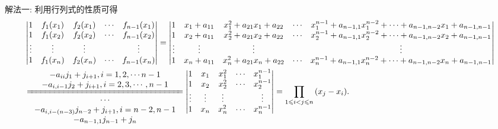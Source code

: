 \documentclass[../../main.tex]{subfiles}%
\begin{document}
\begin{solution}

{\color{blue}解法一:}
利用行列式的性质可得
\begin{align*}
&\left| \begin{matrix}
1&		f_1(x_1)&		f_2(x_1)&		\cdots&		f_{n-1}(x_1)\\
1&		f_1(x_2)&		f_2(x_2)&		\cdots&		f_{n-1}(x_2)\\
\vdots&		\vdots&		\vdots&		&		\vdots\\
1&		f_1(x_n)&		f_2(x_n)&		\cdots&		f_{n-1}(x_n)\\
\end{matrix} \right|
=\left| \begin{matrix}
1&		x_1+a_{11}&		x_{1}^{2}+a_{21}x_1+a_{22}&		\cdots&		x_{1}^{n-1}+a_{n-1,1}x_{1}^{n-2}+\cdots +a_{n-1,n-2}x_1+a_{n-1,n-1}\\
1&		x_2+a_{11}&		x_{2}^{2}+a_{21}x_2+a_{22}&		\cdots&		x_{2}^{n-1}+a_{n-1,1}x_{2}^{n-2}+\cdots +a_{n-1,n-2}x_2+a_{n-1,n-1}\\
\vdots&		\vdots&		\vdots&		&		\vdots\\
1&		x_n+a_{11}&		x_{n}^{2}+a_{21}x_n+a_{22}&		\cdots&		x_{n}^{n-1}+a_{n-1,1}x_{n}^{n-2}+\cdots +a_{n-1,n-2}x_n+a_{n-1,n-1}\\
\end{matrix} \right|
\\
&\xlongequal[\begin{array}{c}
\cdots\\
-a_{i,i-\left( n-3 \right)}j_{n-2}+j_{i+1},i=n-2,n-1\\
-a_{n-1,1}j_{n-1}+j_n\\
\end{array}]{\begin{array}{c}
-a_{ii}j_1+j_{i+1},i=1,2,\cdots n-1\\
-a_{i,i-1}j_2+j_{i+1},i=2,3,\cdots ,n-1\\
\end{array}}\left| \begin{matrix}
1&		x_1&		x_{1}^{2}&		\cdots&		x_{1}^{n-1}\\
1&		x_2&		x_{2}^{2}&		\cdots&		x_{2}^{n-1}\\
\vdots&		\vdots&		\vdots&		&		\vdots\\
1&		x_n&		x_{n}^{2}&		\cdots&		x_{n}^{n-1}\\
\end{matrix} \right|=\prod_{1\leqslant i<j\leqslant n}{\left( x_j-x_i \right) }.
\end{align*}


\end{solution}
\end{document}
